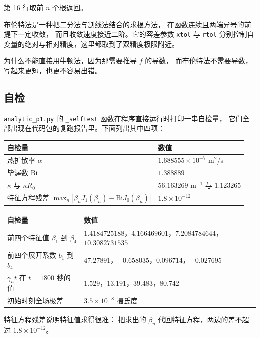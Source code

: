 第 16 行取前 $n$ 个根返回。

布伦特法是一种把二分法与割线法结合的求根方法，
在函数连续且两端异号的前提下一定收敛，
而且收敛速度接近二阶。它的容差参数 \texttt{xtol} 与 \texttt{rtol}
分别控制自变量的绝对与相对精度，这里都取到了双精度极限附近。

为什么不能直接用牛顿法，因为那需要推导 $f$ 的导数，
而布伦特法不需要导数，写起来更短，也更不容易出错。

\subsection{自检}

\texttt{analytic\_p1.py} 的 \texttt{\_selftest} 函数在程序直接运行时打印一串自检量，
它们全部出现在代码包的复跑报告里。下面列出其中四项：

\begin{center}
\begin{tabular}{@{}ll@{}}
\toprule
自检量 & 数值 \\
\midrule
热扩散率 $\alpha$ & $1.688555\times10^{-7}$ m$^2$/s \\
毕渥数 $\mathrm{Bi}$ & $1.388889$ \\
$\kappa$ 与 $\kappa R_0$ & $56.163269$ m$^{-1}$ 与 $1.123265$ \\
特征方程残差 $\max_n|\beta_nJ_1(\beta_n)-\mathrm{Bi}J_0(\beta_n)|$ & $1.8\times10^{-12}$ \\
\bottomrule
\end{tabular}
\end{center}

\begin{center}
\begin{tabular}{@{}ll@{}}
\toprule
自检量 & 数值 \\
\midrule
前四个特征值 $\beta_1$ 到 $\beta_4$ & $1.4184725188$，$4.166469601$，$7.2084784644$，$10.3082731535$ \\
前四个展开系数 $b_1$ 到 $b_4$ & $47.27891$，$-0.658035$，$0.096714$，$-0.027695$ \\
$\gamma_nt$ 在 $t=1800$ 秒的值 & $1.529$，$13.191$，$39.483$，$80.742$ \\
初始时刻全场极差 & $3.5\times10^{-8}$ 摄氏度 \\
\bottomrule
\end{tabular}
\end{center}

特征方程残差说明特征值求得很准：
把求出的 $\beta_n$ 代回特征方程，两边的差不超过 $1.8\times10^{-12}$。

